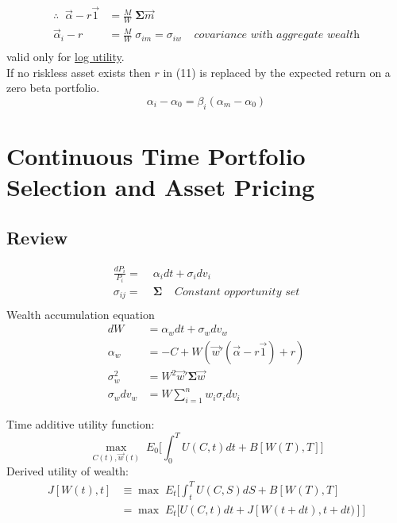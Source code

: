 \documentclass[
14pt,notheorems,hyperref={pdfauthor=whatever}
]{beamer}
\begin{document}
\begin{frame}
\begin{align*}
    \therefore \;\; \vec{\alpha}-r\vec{1} &= \frac{M}{W}\; \bm{\Sigma}\vec{m}\\
    \vec{\alpha}_i-r &= \frac{M}{W}\; \sigma_{im} = \sigma_{iw} \;\;\;\; \textit{covariance with aggregate wealth}\\
\end{align*}
valid only for \underline{log utility}.\\
\hfill\break
If no riskless asset exists then $r$ in (11) is replaced by the expected return on a zero beta portfolio.\\
\begin{equation} \tag{11'}
    \alpha_i-\alpha_0 = \beta_i (\alpha_m-\alpha_0)
\end{equation}
\end{frame}

\section{Continuous Time Portfolio Selection and Asset Pricing}
\subsection{Review}
\begin{frame}
\begin{align*}
    \frac{dP_i}{P_i} =&\; \alpha_i dt + \sigma_i dv_i\\
    \sigma_{ij} =&\; \bm{\Sigma} \;\;\;\; \textit{Constant opportunity set}\\
\end{align*}
Wealth accumulation equation\\
\begin{align*}
    dW &= \alpha_w dt + \sigma_w dv_w\\
    \alpha_w &= -C + W(\vec{w}'(\vec{\alpha}-r\vec{1})+r)\\
    \sigma_w^2 &= W^2 \vec{w}'\bm{\Sigma}\vec{w}\\
    \sigma_w dv_w &= W \sum_{i=1}^n w_i \sigma_i dv_i
\end{align*}
\end{frame}

\begin{frame}
Time additive utility function:\\
\[ \max_{C(t),\vec{w}(t)}\; E_0\Bigg[\int_0^T U(C,t)dt + B[W(T),T]\Bigg]\]
Derived utility of wealth:\\
\begin{align*}
    J[W(t),t] &\equiv \max\;E_t \Bigg[ \int_t^T U(C,S)dS + B[W(T),T]\\
    &= \max\; E_t \Bigg[U(C,t)dt + J[W(t+dt),t+dt)]\Bigg]\\
\end{align*}
\end{frame}
\end{document}

